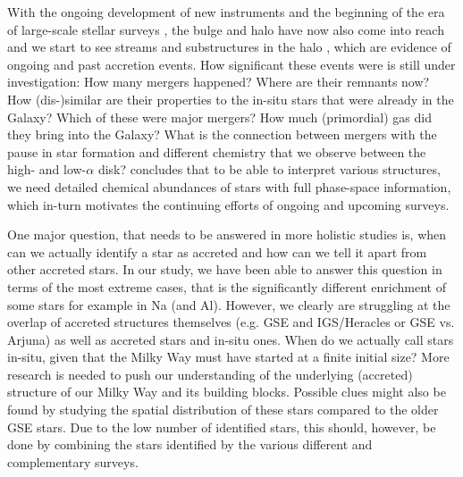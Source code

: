 \documentclass[fleqn,usenatbib]{mnras}
\begin{document}
With the ongoing development of new instruments and the beginning of the era of large-scale stellar surveys \citep[see][for reviews]{Nissen2018, Jofre2019}, the bulge and halo have now also come into reach and we start to see streams and substructures in the halo \citep[see e.g.][for a review]{Helmi2020}, which are evidence of ongoing and past accretion events. How significant these events were is still under investigation: How many mergers happened? Where are their remnants now? How (dis-)similar are their properties to the in-situ stars that were already in the Galaxy? Which of these were major mergers? How much (primordial) gas did they bring into the Galaxy? What is the connection between mergers with the pause in star formation and different chemistry that we observe between the high- and low-$\alpha$ disk? \citet{Helmi2020} concludes that to be able to interpret various structures, we need detailed chemical abundances of stars with full phase-space information, which in-turn motivates the continuing efforts of ongoing and upcoming surveys.

One major question, that needs to be answered in more holistic studies is, when can we actually identify a star as accreted and how can we tell it apart from other accreted stars. In our study, we have been able to answer this question in terms of the most extreme cases, that is the significantly different enrichment of some stars for example in Na (and Al). However, we clearly are struggling at the overlap of accreted structures themselves (e.g. GSE and IGS/Heracles or GSE vs. Arjuna) as well as accreted stars and in-situ ones. When do we actually call stars in-situ, given that the Milky Way must have started at a finite initial size? More research is needed to push our understanding of the underlying (accreted) structure of our Milky Way and its building blocks. Possible clues might also be found by studying the spatial distribution of these stars compared to the older GSE stars. Due to the low number of identified stars, this should, however, be done by combining the stars identified by the various different and complementary surveys.
\end{document}
